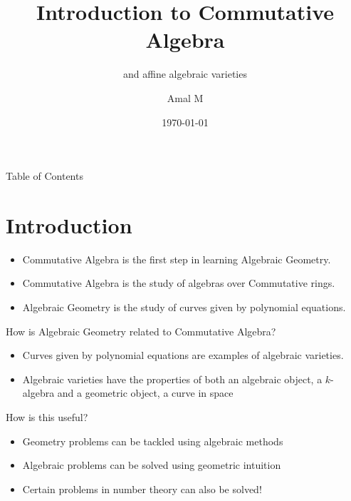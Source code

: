 \documentclass[pdf]{beamer}
\title{Introduction to Commutative Algebra}
\subtitle{and affine algebraic varieties}
\author{Amal M}
\date{\today}
\begin{document}

\begin{frame}
    \thispagestyle{empty}
    \titlepage
\end{frame}
\addtocounter{framenumber}{-1}

\begin{frame}{Table of Contents}
    \tableofcontents
\end{frame}


\section{Introduction}

\begin{frame}
    \begin{itemize}
        \item Commutative Algebra is the first step in learning Algebraic Geometry. 
        \item Commutative Algebra is the study of algebras over Commutative rings.
        \item Algebraic Geometry is the study of curves given by polynomial equations.
    \end{itemize}
\end{frame}

\begin{frame}
    How is Algebraic Geometry related to Commutative Algebra?
    \begin{itemize}
        \item<2-> Curves given by polynomial equations are examples of algebraic varieties. 
        \item<3-> Algebraic varieties have the properties of both an algebraic object, a $k$-algebra and a geometric object, a curve in space
    \end{itemize}
\end{frame}

\begin{frame}
    How is this useful?
    \begin{itemize}
        \item<2-> Geometry problems can be tackled using algebraic methods
        \item<3-> Algebraic problems can be solved using geometric intuition
        \item<4-> Certain problems in number theory can also be solved!
    \end{itemize}
\end{frame}
\end{document}
